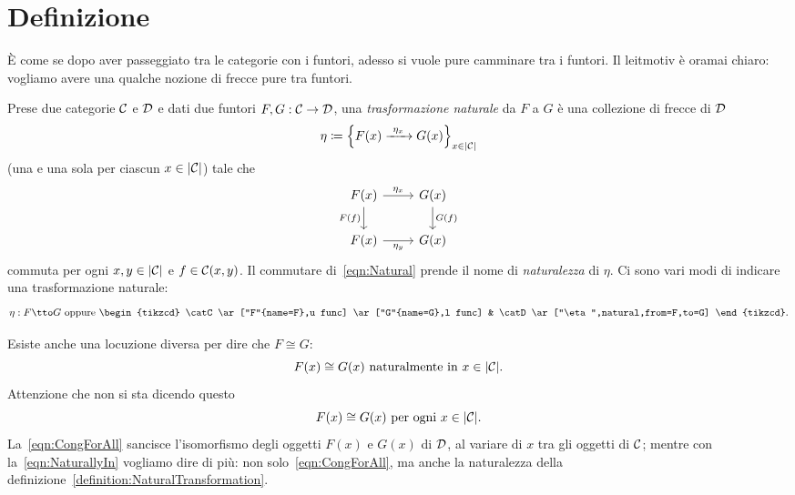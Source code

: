 
\section{Definizione}

È come se dopo aver passeggiato tra le categorie con i funtori, adesso si vuole pure camminare tra i funtori. Il leitmotiv è oramai chiaro: vogliamo avere una qualche nozione di frecce pure tra funtori.

\begin{definizione}\label{definition:NaturalTransformation}
Prese due categorie \(\mathcal C\) e \(\mathcal D\) e dati due funtori \(F, G : \mathcal C \to \mathcal D\), una {\em trasformazione naturale} da \(F\) a \(G\) è una collezione di frecce di \(\mathcal D\)
\[\eta \coloneq \left\{F(x) \xrightarrow{\ \eta_x\ } G(x)\right\}_{x \in \lvert\mathcal C\rvert}\]
(una e una sola per ciascun \(x \in \lvert\mathcal C\rvert\)) tale che
\begin{equation}\begin{tikzcd}
F(x) \ar["\eta_x", r] \ar["F(f)", d, swap] & G(x) \ar["G(f)", d] \\
F(x) \ar["\eta_y", r ,swap] & G(x)
\end{tikzcd}\label{eqn:Natural}\end{equation}
commuta per ogni \(x, y \in \lvert\mathcal C\rvert\) e \(f \in \mathcal C(x,y)\).
Il commutare di~\eqref{eqn:Natural} prende il nome di {\em naturalezza} di \(\eta\). Ci sono vari modi di indicare una trasformazione naturale:
\[\eta : F \tto G \ \text{oppure} \ \begin{tikzcd}
\catC \ar["F"{name=F},u func] \ar["G"{name=G},l func] & \catD
\ar["\eta",natural,from=F,to=G]
\end{tikzcd}.\]
\end{definizione}

\begin{nota}
Esiste anche una locuzione diversa per dire che \(F \cong G\):
\begin{equation}
F(x) \cong G(x) \text{ naturalmente in } x \in \lvert\mathcal C\rvert.\label{eqn:NaturallyIn}
\end{equation}
Attenzione che non si sta dicendo questo 
\begin{equation}
F(x) \cong G(x) \text{ per ogni } x \in \lvert\mathcal C\rvert.\label{eqn:CongForAll}
\end{equation}
La~\eqref{eqn:CongForAll} sancisce l'isomorfismo degli oggetti \(F(x)\) e \(G(x)\) di \(\mathcal D\), al variare di \(x\) tra gli oggetti di \(\mathcal C\); mentre con la~\eqref{eqn:NaturallyIn} vogliamo dire di più: non solo~\eqref{eqn:CongForAll}, ma anche la naturalezza della definizione~\ref{definition:NaturalTransformation}.
\end{nota}

